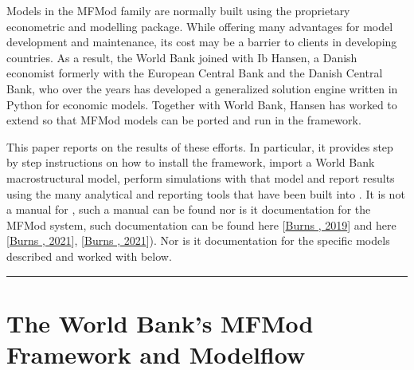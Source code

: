 \documentclass[letterpaper,10pt,english]{jupyterBook}
\begin{document}
\sphinxAtStartPar
Models in the MFMod family are normally built using the proprietary  econometric and modelling package. While offering many advantages for model development and maintenance, its cost may be a barrier to clients in developing countries.  As a result, the World Bank joined with Ib Hansen, a Danish economist formerly with the European Central Bank and the Danish Central Bank, who over the years has developed  a generalized solution engine written in Python for economic models. Together with World Bank, Hansen has worked to extend  so that MFMod models can be ported and run in the framework.

\sphinxAtStartPar
This paper reports on the results of these efforts. In particular, it provides step by step instructions on how to install the  framework, import a World Bank macrostructural model,  perform simulations with that model and report results using the many analytical and reporting tools that have been built into .  It is not a manual for , such a manual can be found  nor is it documentation for the MFMod system, such documentation can be found here {[}\hyperlink{cite.content/99_BackMatter/References:id15}{Burns , 2019}{]} and here {[}\hyperlink{cite.content/99_BackMatter/References:id18}{Burns , 2021}{]}, {[}\hyperlink{cite.content/99_BackMatter/References:id14}{Burns , 2021}{]}). Nor is it documentation for the specific models described and worked with below.


\bigskip\hrule\bigskip


\sphinxstepscope


\part{The World Bank's MFMod Framework and Modelflow}

\sphinxstepscope
\end{document}
